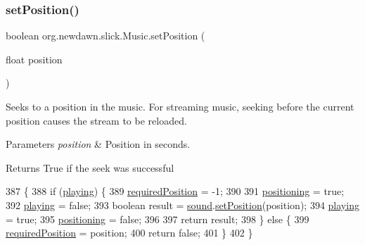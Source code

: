 \subsubsection{\texorpdfstring{set\+Position()}{setPosition()}}
{\footnotesize\ttfamily boolean org.\+newdawn.\+slick.\+Music.\+set\+Position (\begin{DoxyParamCaption}\item[{float}]{position }\end{DoxyParamCaption})\hspace{0.3cm}{\ttfamily [inline]}}

Seeks to a position in the music. For streaming music, seeking before the current position causes the stream to be reloaded.


\begin{DoxyParams}{Parameters}
{\em position} & Position in seconds. \\
\hline
\end{DoxyParams}
\begin{DoxyReturn}{Returns}
True if the seek was successful 
\end{DoxyReturn}

\begin{DoxyCode}
387                                                \{
388         \textcolor{keywordflow}{if} (\mbox{\hyperlink{classorg_1_1newdawn_1_1slick_1_1_music_a20709d497ca9027d874f7ffe970ce738}{playing}}) \{
389             \mbox{\hyperlink{classorg_1_1newdawn_1_1slick_1_1_music_ac983016dac747c325214ae019b79d0f0}{requiredPosition}} = -1;
390             
391             \mbox{\hyperlink{classorg_1_1newdawn_1_1slick_1_1_music_a5b37d26c143b07b08eac2b3d79f940b9}{positioning}} = \textcolor{keyword}{true};
392             \mbox{\hyperlink{classorg_1_1newdawn_1_1slick_1_1_music_a20709d497ca9027d874f7ffe970ce738}{playing}} = \textcolor{keyword}{false};
393             \textcolor{keywordtype}{boolean} result = \mbox{\hyperlink{classorg_1_1newdawn_1_1slick_1_1_music_a17daed326f24bf361ff8677c33f06b2f}{sound}}.\mbox{\hyperlink{interfaceorg_1_1newdawn_1_1slick_1_1openal_1_1_audio_ace6e2e6fd29f40a8fe5daf8b28bc75e7}{setPosition}}(position);
394             \mbox{\hyperlink{classorg_1_1newdawn_1_1slick_1_1_music_a20709d497ca9027d874f7ffe970ce738}{playing}} = \textcolor{keyword}{true};
395             \mbox{\hyperlink{classorg_1_1newdawn_1_1slick_1_1_music_a5b37d26c143b07b08eac2b3d79f940b9}{positioning}} = \textcolor{keyword}{false};
396 
397             \textcolor{keywordflow}{return} result;
398         \} \textcolor{keywordflow}{else} \{
399             \mbox{\hyperlink{classorg_1_1newdawn_1_1slick_1_1_music_ac983016dac747c325214ae019b79d0f0}{requiredPosition}} = position;
400             \textcolor{keywordflow}{return} \textcolor{keyword}{false};
401         \}
402     \}
\end{DoxyCode}
\mbox{\label{classorg_1_1newdawn_1_1slick_1_1_music_ac80cc7fda5ba80437bf1ea6efdc3f1a7}} 

